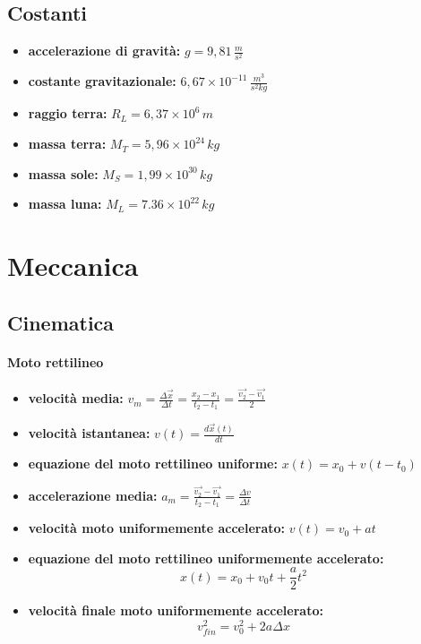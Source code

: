 \documentclass[a4paper,12pt, oneside]{book}
\begin{document}
\section{Costanti}
\begin{itemize}
	\item \textbf{accelerazione di gravità:} $g=9,81\, \frac{m}{s^2}$
	\item \textbf{costante gravitazionale:} $6,67 \times 10^{-11}\, \frac{m^3}{s^2kg}$
	\item \textbf{raggio terra:} $R_L=6,37\times 10^{6}\, m$
	\item \textbf{massa terra:} $M_T=5,96\times 10^{24}\, kg$
	\item \textbf{massa sole:} $M_S =1,99\times 10^{30}\, kg$
	\item \textbf{massa luna:} $M_L=7.36\times 10^{22}\, kg$
\end{itemize}
\chapter{Meccanica}
\section{Cinematica}
\subsubsection{Moto rettilineo}
\begin{itemize}
	\item \textbf{velocità media: }$v_m=\frac{\Delta \vec{x}}{\Delta t}=\frac{x_2-x_1}{t_2-t_1}=\frac{\vec{v_2}-\vec{v_1}}{2}$
	\item  \textbf{velocità istantanea: }$v(t)=\frac{d\vec{x}(t)}{dt}$
	\item \textbf{equazione del moto rettilineo uniforme: }$x(t)=x_0+v(t-t_0)$
	\item \textbf{accelerazione media:} $a_m=\frac{\vec{v_2}-\vec{v_1}}{t_2-t_1}=\frac{\Delta v}{\Delta t}$
	\item \textbf{velocità moto uniformemente accelerato:} $v(t)=v_0+at$
	\item \textbf{equazione del moto rettilineo uniformemente accelerato:} $$x(t)=x_0+v_0t+\frac{a}{2}t^2$$
	\item \textbf{velocità finale moto uniformemente accelerato:}
	      $$v_{fin}^2=v_0^2+2a\Delta x$$
\end{itemize}
\newpage
\end{document}
